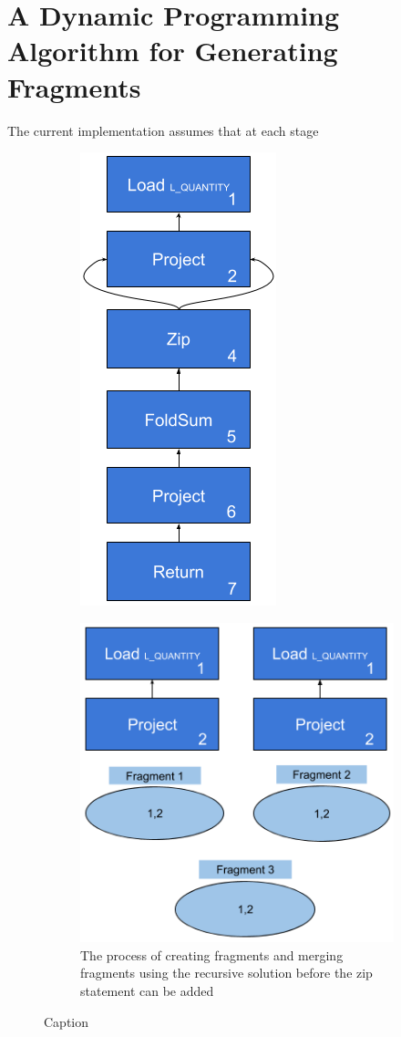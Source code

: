\chapter{A Dynamic Programming Algorithm for Generating Fragments}
\label{appendix:dpalgo}

The current implementation assumes that at each stage


\begin{figure}
    \centering
    \begin{subfigure}{0.5\linewidth}
        \centering
        \includegraphics[width=0.5\linewidth]{appendix/DPExplain.png}
        \caption{}
        \label{fig:DPSimpleQuery}
    \end{subfigure}
    \begin{subfigure}{\linewidth}
        \centering
        \includegraphics[width=0.5\linewidth]{appendix/DPExplainFrag.png}
        \caption{The process of creating fragments and merging fragments using the recursive solution before the zip statement can be added}
        \label{fig:DPSimpleQueryFrag}
    \end{subfigure}
    \caption{Caption}
    \label{fig:my_label}
\end{figure}